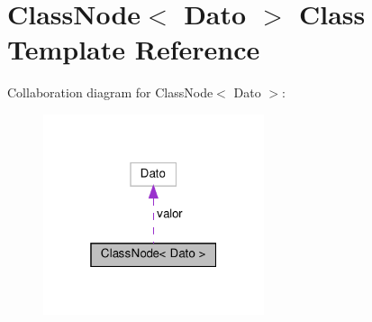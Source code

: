 \hypertarget{class_class_node}{}\section{Class\+Node$<$ Dato $>$ Class Template Reference}
\label{class_class_node}


Collaboration diagram for Class\+Node$<$ Dato $>$\+:
\nopagebreak
\begin{figure}[H]
\begin{center}
\leavevmode
\includegraphics[width=184pt]{class_class_node__coll__graph}
\end{center}
\end{figure}
